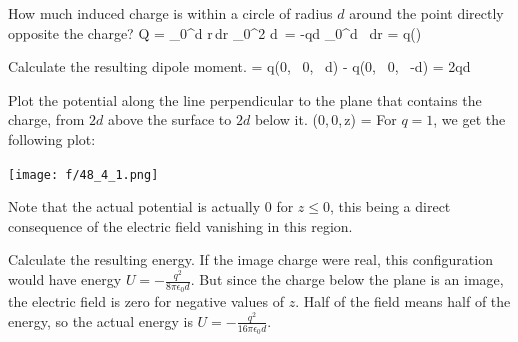 \item How much induced charge is within a circle of radius $d$ around the point directly opposite the charge?
\be
Q = \int_0^d r\,dr \int_0^{2\pi} d\phi \, \sigma = -qd \int_0^d  \, dr = q\left(\right)
\ee

\item Calculate the resulting dipole moment.
\be
\bp = q(0, \, 0, \, d) - q(0, \, 0, \, -d) = 2qd\bf{}
\ee

\item Plot the potential along the line perpendicular to the plane that contains the charge, from $2d$ above the surface to $2d$ below it.
\be
\phi(0,\,0,\,z) = 
\ee
For $q=1$, we get the following plot:
\begin{center}
\texttt{[image: f/48\_4\_1.png]}
\end{center}
Note that the actual potential is actually 0 for $z \leq 0$, this being a direct consequence of the electric field vanishing in this region.
 
\item Calculate the resulting energy.
\newline If the image charge were real, this configuration would have energy $U = -\frac{q^2}{8 \pi \epsilon_0 d}$. But since the charge below the plane is an image, the electric field is zero for negative values of $z$. Half of the field means half of the energy, so the actual energy is $U = -\frac{q^2}{16 \pi \epsilon_0 d}$.

\enu
\newpage

